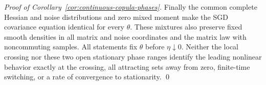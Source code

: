 \begin{proof}[Proof of Corollary~\ref{cor:continuous-copula-phases}]
Finally the common complete Hessian and noise distributions and zero
mixed moment make the SGD covariance equation identical for every $\theta$.
These mixtures also preserve fixed smooth densities in all matrix and
noise coordinates and the matrix law with noncommuting samples. All statements fix $\theta$ before
$\eta\downarrow0$. Neither the local crossing nor these two open stationary
phase ranges identify the leading nonlinear behavior exactly at the
crossing, all attracting sets away from zero, finite-time switching, or
a rate of convergence to stationarity.
\qed\end{proof}
